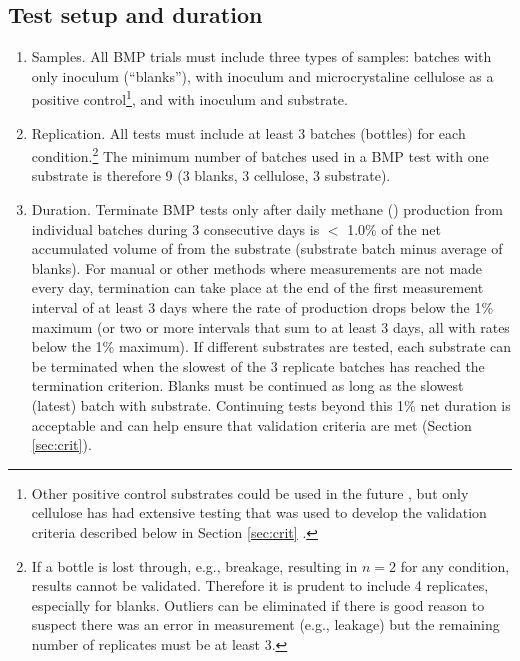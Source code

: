 \documentclass[]{article}
\begin{document}
\subsection{Test setup and duration}
\label{sec:setup}
\begin{enumerate}
  \item Samples. 
    All BMP trials must include three types of samples: batches with only inoculum (``blanks''), with inoculum and microcrystaline cellulose as a positive control\footnote{
      Other positive control substrates could be used in the future \citep{kochEvaluationCommonSupermarket2020}, but only cellulose has had extensive testing that was used to develop the validation criteria described below in Section \ref{sec:crit} \citep{hafnerImprovingInterlaboratoryReproducibility2020}.
    }, and with inoculum and substrate.
    \item Replication. 
    All tests must include at least 3 batches (bottles) for each condition.\footnote{
      If a bottle is lost through, e.g., breakage, resulting in $n=2$ for any condition, results cannot be validated.
      Therefore it is prudent to include 4 replicates, especially for blanks.
      Outliers can be eliminated if there is good reason to suspect there was an error in measurement (e.g., leakage) but the remaining number of replicates must be at least 3.
    }
    The minimum number of batches used in a BMP test with one substrate is therefore 9 (3 blanks, 3 cellulose, 3 substrate).
  \item Duration. 
    Terminate BMP tests only after daily methane () production from individual batches during 3 consecutive days is $<$ 1.0\% of the net accumulated volume of  from the substrate (substrate batch minus average of blanks). 
    For manual or other methods where measurements are not made every day, termination can take place at the end of the first measurement interval of at least 3 days where the rate of production drops below the 1\% maximum (or two or more intervals that sum to at least 3 days, all with rates below the 1\% maximum).
    If different substrates are tested, each substrate can be terminated when the slowest of the 3 replicate batches has reached the termination criterion.
    Blanks must be continued as long as the slowest (latest) batch with substrate.
    Continuing tests beyond this 1\% net duration is acceptable and can help ensure that validation criteria are met (Section \ref{sec:crit}).
\end{enumerate}
\end{document}
